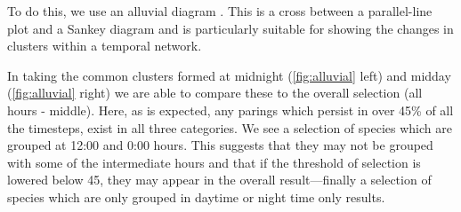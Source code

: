 To do this, we use an alluvial diagram \citep{alluvial}. This is a cross between a parallel-line plot and a Sankey diagram and is particularly suitable for showing the changes in clusters within a temporal network.

In taking the common clusters formed at midnight (\autoref{fig:alluvial} left)  and midday (\autoref{fig:alluvial} right) we are able to compare these to the overall selection (all hours - middle). Here, as is expected, any parings which persist in over 45\% of all the timesteps, exist in all three categories. We see a selection of species which are grouped at 12:00 and 0:00 hours. This suggests that they may not be grouped with some of the intermediate hours and that if the threshold of selection is lowered below 45, they may appear in the overall result—finally a selection of species which are only grouped in daytime or night time only results.



